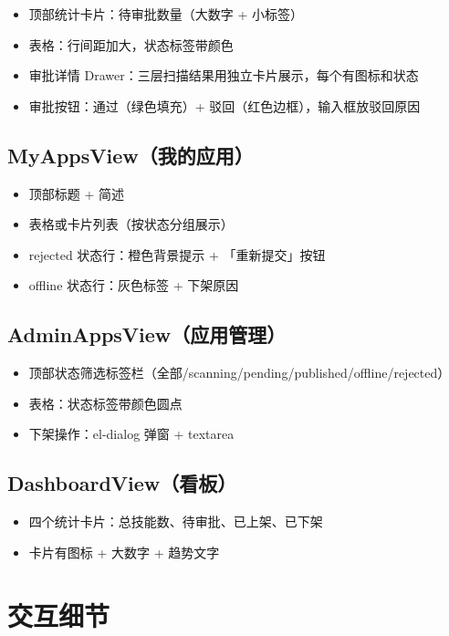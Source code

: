 \documentclass[11pt,a4paper]{article}
\begin{document}
\begin{itemize}[nosep]
  \item 顶部统计卡片：待审批数量（大数字 + 小标签）
  \item 表格：行间距加大，状态标签带颜色
  \item 审批详情 Drawer：三层扫描结果用独立卡片展示，每个有图标和状态
  \item 审批按钮：通过（绿色填充）+ 驳回（红色边框），输入框放驳回原因
\end{itemize}

\subsection{MyAppsView（我的应用）}

\begin{itemize}[nosep]
  \item 顶部标题 + 简述
  \item 表格或卡片列表（按状态分组展示）
  \item rejected 状态行：橙色背景提示 + 「重新提交」按钮
  \item offline 状态行：灰色标签 + 下架原因
\end{itemize}

\subsection{AdminAppsView（应用管理）}

\begin{itemize}[nosep]
  \item 顶部状态筛选标签栏（全部/scanning/pending/published/offline/rejected）
  \item 表格：状态标签带颜色圆点
  \item 下架操作：el-dialog 弹窗 + textarea
\end{itemize}

\subsection{DashboardView（看板）}

\begin{itemize}[nosep]
  \item 四个统计卡片：总技能数、待审批、已上架、已下架
  \item 卡片有图标 + 大数字 + 趋势文字
\end{itemize}

\section{交互细节}
\end{document}
